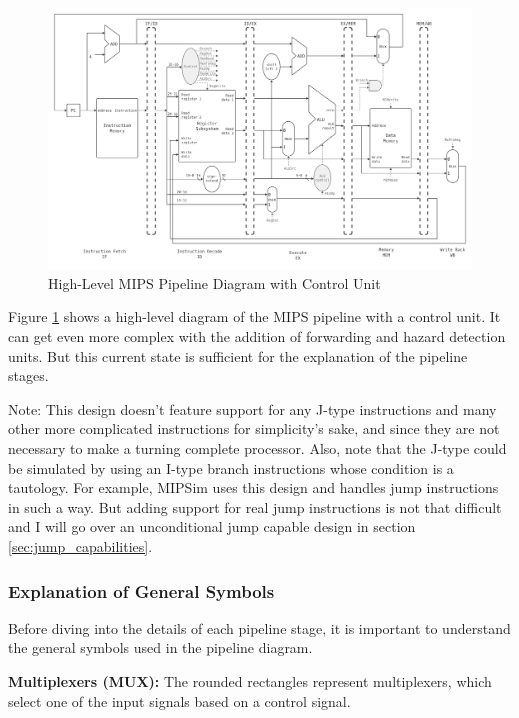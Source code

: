 \begin{figure}[H]
    \centering
    \includegraphics[width=1\textwidth]{assets/images/mips_pipeline.png}
    \caption{High-Level MIPS Pipeline Diagram with Control Unit}
    \label{fig:mips_pipeline}
\end{figure}

Figure \ref{fig:mips_pipeline} shows a high-level diagram of the MIPS pipeline with a control unit. It can get even more complex with the addition of forwarding and hazard detection units. But this current state is sufficient for the explanation of the pipeline stages.

Note: This design doesn't feature support for any J-type instructions and many other more complicated instructions for simplicity’s sake, and since they are not necessary to make a turning complete processor. Also, note that the J-type could be simulated by using an I-type branch instructions whose condition is a tautology. For example, MIPSim uses this design and handles jump instructions in such a way. But adding support for real jump instructions is not that difficult and I will go over an unconditional jump capable design in section \ref{sec:jump_capabilities}.



\subsubsection{Explanation of General Symbols}
Before diving into the details of each pipeline stage, it is important to understand the general symbols used in the pipeline diagram.

\textbf{Multiplexers (MUX):} The rounded rectangles represent multiplexers, which select one of the input signals based on a control signal.

